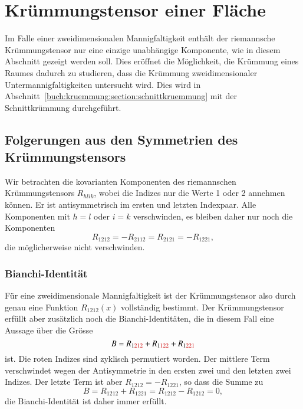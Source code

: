 %
%
\section{Krümmungstensor einer Fläche
\label{buch:kruemmung:section:flaeche}}
Im Falle einer zweidimensionalen Mannigfaltigkeit enthält der
riemannsche Krümmungstensor nur eine einzige unabhängige Komponente,
wie in diesem Abschnitt gezeigt werden soll.
Dies eröffnet die Möglichkeit, die Krümmung eines Raumes dadurch zu
studieren, dass die Krümmung zweidimensionaler Untermannigfaltigkeiten
untersucht wird.
Dies wird in Abschnitt~\ref{buch:kruemmung:section:schnittkruemmung}
mit der Schnittkrümmung durchgeführt.

%
%
\subsection{Folgerungen aus den Symmetrien des Krümmungstensors}
Wir betrachten die kovarianten Komponenten des riemannschen
Krümmungstensors $R_{hlik}$, wobei die Indizes nur die Werte 1 oder 2
annehmen können.
Er ist antisymmetrisch im ersten und letzten Indexpaar.
Alle Komponenten mit $h=l$ oder $i=k$ verschwinden, es bleiben daher
nur noch die Komponenten
\[
R_{1212}
=
-R_{2112}
=
R_{2121}
=
-R_{1221},
\]
die möglicherweise nicht verschwinden.

\subsubsection{Bianchi-Identität}
Für eine zweidimensionale Mannigfaltigkeit ist der Krümmungstensor also
durch genau eine Funktion $R_{1212}(x)$ vollständig bestimmt.
Der Krümmungstensor erfüllt aber zusätzlich noch die Bianchi-Identitäten,
die in diesem Fall eine Aussage über die Grösse
\[
B
=
R_{1{\color{darkred}212}}
+
R_{1{\color{darkred}122}}
+
R_{1{\color{darkred}221}}
\]
ist.
Die roten Indizes sind zyklisch permutiert worden.
Der mittlere Term verschwindet wegen der Antisymmetrie in den ersten
zwei und den letzten zwei Indizes.
Der letzte Term ist aber $R_{1212}=-R_{1221}$, so dass die Summe zu
\[
B
=
R_{1212}+R_{1221}
=
R_{1212}-R_{1212}
=
0,
\]
die Bianchi-Identität ist daher immer erfüllt.


